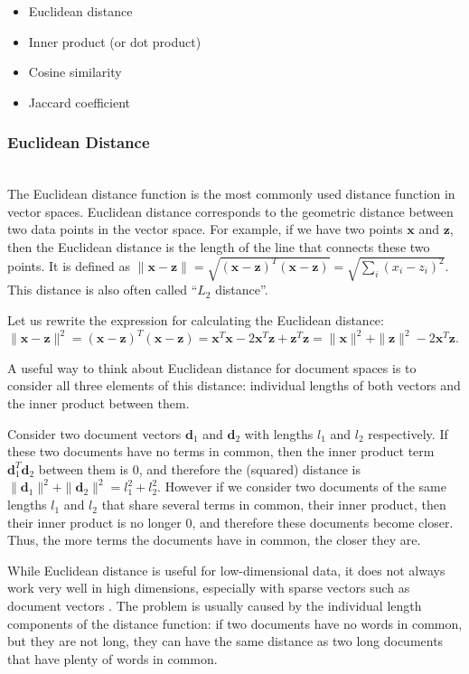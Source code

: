 \begin{itemize}\itemsep1pt\parskip0pt
  \item Euclidean distance
  \item Inner product (or dot product)
  \item Cosine similarity
  \item Jaccard coefficient
\end{itemize}


\subsubsection{Euclidean Distance} \ \\

The Euclidean distance function is the most commonly used distance
function in vector spaces. Euclidean distance corresponds to
the geometric distance between two data points in the vector space.
For example, if we have two points $\mathbf x$ and
$\mathbf z$, then the Euclidean distance is the
length of the line that connects these two points.
It is defined as
$\| \mathbf x - \mathbf z \| = \sqrt{ (\mathbf x - \mathbf z)^T (\mathbf x - \mathbf z) } = \sqrt{\sum_i (x_i - z_i)^2}$. This distance is also often called
``$L_2$ distance''.


Let us rewrite the expression for calculating the Euclidean distance:
$\| \mathbf x - \mathbf z \|^2 = (\mathbf x - \mathbf z)^T (\mathbf x - \mathbf z) =
\mathbf x^T \mathbf x - 2 \mathbf x^T \mathbf z + \mathbf z^T \mathbf z =
\| \mathbf x \|^2 + \| \mathbf z \|^2 - 2 \mathbf x^T \mathbf z$.

A useful way to think about Euclidean distance for document spaces
is to consider all three elements of this distance: individual
lengths of both vectors and the inner product between them.

Consider two document vectors $\mathbf d_1$ and $\mathbf d_2$ with lengths
$l_1$ and $l_2$ respectively. If these two documents have
no terms in common, then the inner product term $\mathbf d_1^T \mathbf d_2$
between them is 0, and therefore the (squared) distance is
$\| \mathbf d_1 \|^2 + \| \mathbf d_2 \|^2 = l_1^2 + l_2^2$.
However if we consider two documents of the same lengths
$l_1$ and $l_2$ that share several terms in common,
their inner product, then their inner product is no longer 0,
and therefore these documents become closer. Thus, the more terms
the documents have in common, the closer they are.


While Euclidean distance is useful for low-dimensional data,
it does not always work very well in high dimensions, especially
with sparse vectors such as document vectors \cite{ertoz2003finding}.
The problem is usually caused by the individual length components of
the distance function: if two documents have no words in common,
but they are not long, they can have the same distance as two long
documents that have plenty of words in common.

